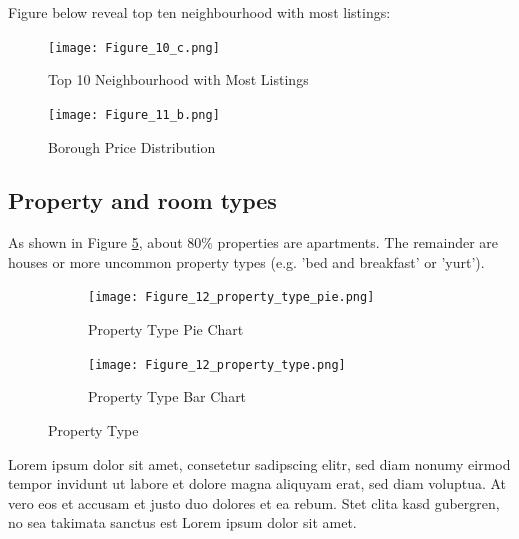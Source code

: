 Figure below reveal top ten neighbourhood with most listings:
\begin{figure}[H] \centering
    \texttt{[image: Figure\_10\_c.png]}
    \label{fig:top-ten-most-listing-neighbourhood}
    \caption{Top 10 Neighbourhood with Most Listings}
\end{figure}




\begin{figure}[H]\centering
    \texttt{[image: Figure\_11\_b.png]}
    \caption{Borough Price Distribution}
    \label{fig:borough-price-distribution}
\end{figure}

\subsection{Property and room types}

As shown in Figure \ref{fig:property_type},
about 80\% properties are apartments. The remainder are houses or more uncommon
property types (e.g. 'bed and breakfast' or 'yurt').

\begin{figure}[H]
    \centering
    \begin{subfigure}[b]{0.48\textwidth}
        \centering
        \caption{Property Type Pie Chart}
        \texttt{[image: Figure\_12\_property\_type\_pie.png]}
        \label{fig:property_type_pie}
    \end{subfigure}
    \begin{subfigure}[b]{0.48\textwidth}
        \centering
        \caption{Property Type Bar Chart}
        \texttt{[image: Figure\_12\_property\_type.png]}
        \label{fig:property_type_bar}
    \end{subfigure}

    \caption{Property Type}
    \label{fig:property_type}
\end{figure}


Lorem ipsum dolor sit amet, consetetur sadipscing elitr, sed diam nonumy eirmod
tempor invidunt ut labore et dolore magna aliquyam erat, sed diam voluptua. At
vero eos et accusam et justo duo dolores et ea rebum. Stet clita kasd gubergren,
no sea takimata sanctus est Lorem ipsum dolor sit amet.

